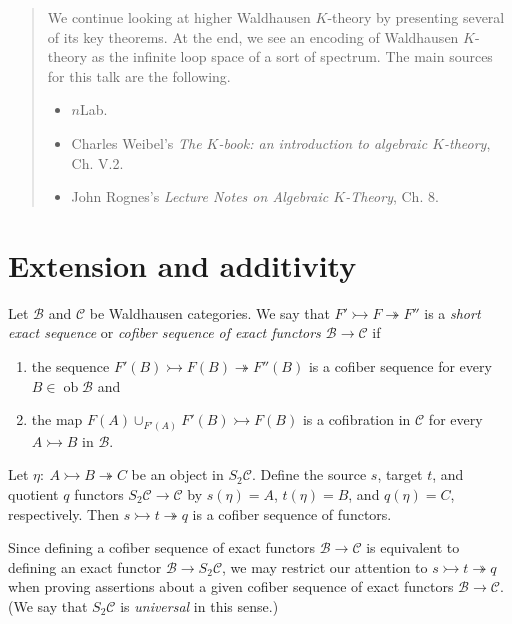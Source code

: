 \documentclass[10pt,letterpaper,cm]{nupset}
\theoremstyle{definition}
\theoremstyle{theorem}
\theoremstyle{remark}
\newcommand{\1}{\mathbf{1}}
\renewcommand{\b}{\mathscr{B}}
\renewcommand{\c}{\mathscr{C}}
\newcommand{\0}{\vec 0}
\DeclareMathOperator{\ob}{ob}
\begin{document}
\begin{abstract}
We continue looking at higher Waldhausen $K$-theory by presenting several of its key theorems. At the end, we see an encoding of Waldhausen $K$-theory as the infinite loop space of a sort of spectrum. The main sources for this talk are the following.
\begin{itemize}
\item $n$Lab.
\item Charles Weibel's \textit{The $K$-book: an introduction to algebraic $K$-theory},  Ch. V.2.
\item John Rognes's \textit{Lecture Notes on Algebraic $K$-Theory}, Ch. 8.
\end{itemize}
\end{abstract}

\smallskip

\section{Extension and additivity}

Let $\b$ and $\c$ be Waldhausen categories. We say that $F' \rightarrowtail F \twoheadrightarrow F''$ is a \textit{short exact sequence} or \textit{cofiber sequence of exact functors $\b \to \c$} if 
\begin{enumerate}[label=(\roman*)]
\item the sequence  $F'(B) \rightarrowtail F(B) \twoheadrightarrow F''(B)$ is a cofiber sequence for every $B\in \ob{\b}$ and 
\item the map $F(A) \cup_{F'(A)} F'(B) \rightarrowtail F(B)$ is a cofibration in $\c$ for every $A \rightarrowtail B$ in $\b$.
\end{enumerate}


Let $\eta :\ A \rightarrowtail B \twoheadrightarrow C$ be an object in $S_2{\c}$. Define the source $s$, target $t$, and quotient $q$ functors $S_2{\c} \to \c$ by $s(\eta) = A$, $t(\eta) = B$, and $q(\eta) = C$, respectively. Then $s \rightarrowtail t \twoheadrightarrow q$ is a cofiber sequence of functors. 

Since defining a cofiber sequence of exact functors $\b \to \c$ is equivalent to defining an exact functor $\b \to S_2{\c}$, we may restrict our attention to $s \rightarrowtail t \twoheadrightarrow q$ when proving assertions about a given cofiber sequence of exact functors $\b \to \c$. (We say that $S_2{\c}$ is \textit{universal} in this sense.)
\end{document}
